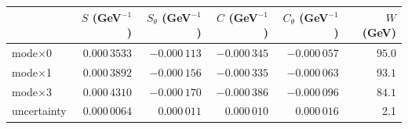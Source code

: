 \documentclass[compress]{beamer}
\begin{document}
\begin{frame}
\vfill
\hfill \begin{tabular}{l r r r r r}
& $S$ (GeV$^{-1}$) & $S_{\theta}$ (GeV$^{-1}$) & $C$ (GeV$^{-1}$) & $C_{\theta}$ (GeV$^{-1}$) & $W$ (GeV) \\\hline
mode$\times$0 & $0.000\,3533$ & $-0.000\,113$ & $-0.000\,345$ & $-0.000\,057$ & $95.0$ \\
mode$\times$1 & $0.000\,3892$ & $-0.000\,156$ & $-0.000\,335$ & $-0.000\,063$ & $93.1$ \\
mode$\times$3 & $0.000\,4310$ & $-0.000\,170$ & $-0.000\,386$ & $-0.000\,096$ & $84.1$ \\\hline
uncertainty & $0.000\,0064$ & $0.000\,011$ & $0.000\,010$ & $0.000\,016$ & 2.1 \\
\end{tabular}
\end{frame}
\end{document}
